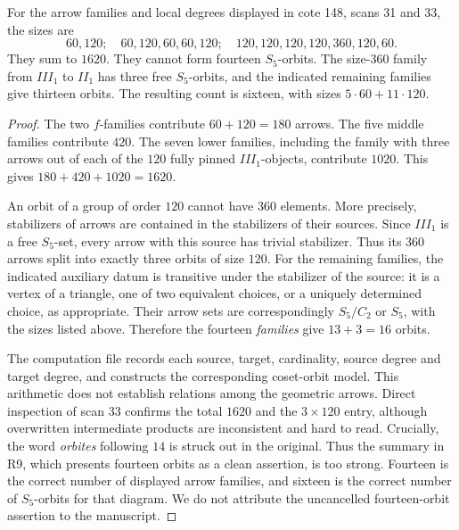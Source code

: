 For the arrow families and local degrees displayed in cote 148,
scans 31 and 33, the sizes are
\[
 60,120;\quad60,120,60,60,120;\quad
 120,120,120,120,360,120,60.
\]
They sum to $1620$.  They cannot form fourteen $S_5$-orbits.
The size-$360$ family from $III_1$ to $II_1$ has three free
$S_5$-orbits, and the indicated remaining families give thirteen
orbits.  The resulting count is sixteen, with sizes
$5\cdot60+11\cdot120$.
\begin{proof}
The two $f$-families contribute $60+120=180$ arrows.  The five
middle families contribute $420$.  The seven lower families,
including the family with three arrows out of each of the
$120$ fully pinned $III_1$-objects, contribute $1020$.
This gives $180+420+1020=1620$.

An orbit of a group of order $120$ cannot have $360$ elements.
More precisely, stabilizers of arrows are contained in the
stabilizers of their sources.  Since $III_1$ is a free $S_5$-set,
every arrow with this source has trivial stabilizer.  Thus its
$360$ arrows split into exactly three orbits of size $120$.
For the remaining families, the indicated auxiliary datum is
transitive under the stabilizer of the source: it is a vertex of
a triangle, one of two equivalent choices, or a uniquely determined
choice, as appropriate.  Their arrow sets are correspondingly
$S_5/C_2$ or $S_5$, with the sizes listed above.  Therefore the
fourteen \emph{families} give $13+3=16$ orbits.

The computation file records each source, target, cardinality,
source degree and target degree, and constructs the corresponding
coset-orbit model.  This arithmetic does not establish relations
among the geometric arrows.  Direct inspection of
scan 33 confirms the total $1620$ and the $3\times120$ entry,
although overwritten intermediate products are inconsistent and hard
to read.  Crucially, the word \emph{orbites} following $14$ is
struck out in the original.  Thus the summary in R9, which presents
fourteen orbits as a clean assertion, is too strong.  Fourteen is
the correct number of displayed arrow families, and sixteen is the
correct number of $S_5$-orbits for that diagram.  We do not attribute
the uncancelled fourteen-orbit assertion to the manuscript.
\end{proof}

